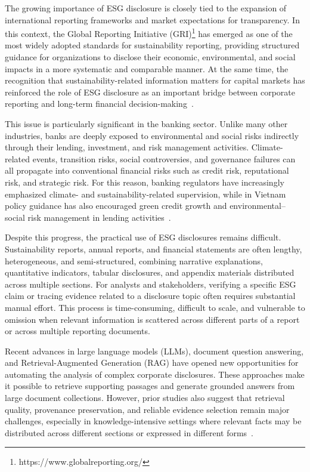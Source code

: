 \documentclass[sn-mathphys, oneside]{sn-jnl}
\begin{document}
The growing importance of ESG disclosure is closely tied to the expansion of international reporting frameworks and market expectations for transparency. In this context, the Global Reporting Initiative (GRI)\footnote{https://www.globalreporting.org/} has emerged as one of the most widely adopted standards for sustainability reporting, providing structured guidance for organizations to disclose their economic, environmental, and social impacts in a more systematic and comparable manner. At the same time, the recognition that sustainability-related information matters for capital markets has reinforced the role of ESG disclosure as an important bridge between corporate reporting and long-term financial decision-making~\cite{ungc2004,gri}.

This issue is particularly significant in the banking sector. Unlike many other industries, banks are deeply exposed to environmental and social risks indirectly through their lending, investment, and risk management activities. Climate-related events, transition risks, social controversies, and governance failures can all propagate into conventional financial risks such as credit risk, reputational risk, and strategic risk. For this reason, banking regulators have increasingly emphasized climate- and sustainability-related supervision, while in Vietnam policy guidance has also encouraged green credit growth and environmental--social risk management in lending activities~\cite{bcbs2022,sbv2015}.

Despite this progress, the practical use of ESG disclosures remains difficult. Sustainability reports, annual reports, and financial statements are often lengthy, heterogeneous, and semi-structured, combining narrative explanations, quantitative indicators, tabular disclosures, and appendix materials distributed across multiple sections. For analysts and stakeholders, verifying a specific ESG claim or tracing evidence related to a disclosure topic often requires substantial manual effort. This process is time-consuming, difficult to scale, and vulnerable to omission when relevant information is scattered across different parts of a report or across multiple reporting documents.

Recent advances in large language models (LLMs), document question answering, and Retrieval-Augmented Generation (RAG) have opened new opportunities for automating the analysis of complex corporate disclosures. These approaches make it possible to retrieve supporting passages and generate grounded answers from large document collections. However, prior studies also suggest that retrieval quality, provenance preservation, and reliable evidence selection remain major challenges, especially in knowledge-intensive settings where relevant facts may be distributed across different sections or expressed in different forms~\cite{lewis2020rag,mishra2024docqa}.
\end{document}
